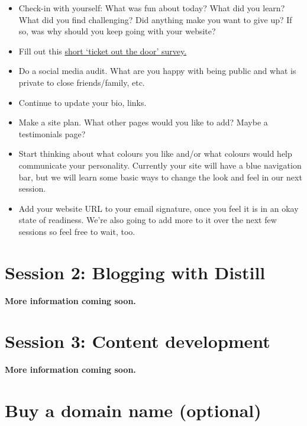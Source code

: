 \documentclass[
]{article}
\providecommand{\tightlist}{%
  \setlength{\itemsep}{0pt}\setlength{\parskip}{0pt}}
\begin{document}
\begin{itemize}
\tightlist
\item
  Check-in with yourself: What was fun about today? What did you learn? What did you find challenging? Did anything make you want to give up? If so, was why should you keep going with your website?
\item
  Fill out this \href{https://forms.office.com/Pages/ResponsePage.aspx?id=JsKqeAMvTUuQN7RtVsVSEOKHUU3SzAJJhmOKjJhDWEpUQUJETTYxTkhUVUlQU0VUOEFFMlBWTjA2Vy4u}{short `ticket out the door' survey.}
\item
  Do a social media audit. What are you happy with being public and what is private to close friends/family, etc.
\item
  Continue to update your bio, links.
\item
  Make a site plan. What other pages would you like to add? Maybe a testimonials page?
\item
  Start thinking about what colours you like and/or what colours would help communicate your personality. Currently your site will have a blue navigation bar, but we will learn some basic ways to change the look and feel in our next session.
\item
  Add your website URL to your email signature, once you feel it is in an okay state of readiness. We're also going to add more to it over the next few sessions so feel free to wait, too.
\end{itemize}

\hypertarget{session-2-blogging-with-distill}{%
\section{Session 2: Blogging with Distill}\label{session-2-blogging-with-distill}}

\textbf{More information coming soon.}

\hypertarget{session-3-content-development}{%
\section{Session 3: Content development}\label{session-3-content-development}}

\textbf{More information coming soon.}

\hypertarget{appendix-appendix}{%
\appendix}


\hypertarget{domain}{%
\section{Buy a domain name (optional)}\label{domain}}
\end{document}
